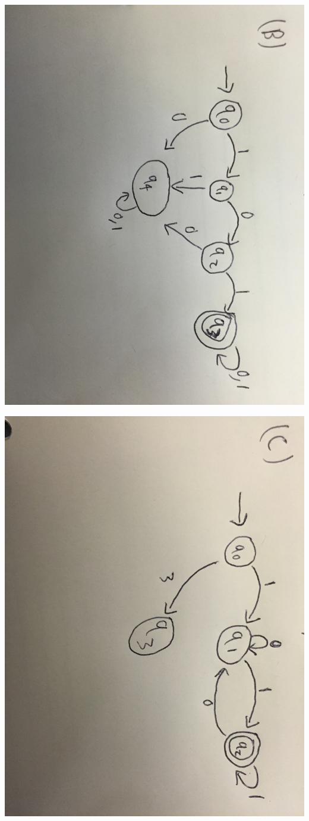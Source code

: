 \documentclass[solution, letterpaper]{cs20inclass}
\begin{document}
\begin{solution}
\includegraphics[width=15cm]{class16p1b}


\includegraphics[width=15cm]{class16p1c}



\end{solution}
\end{document}
